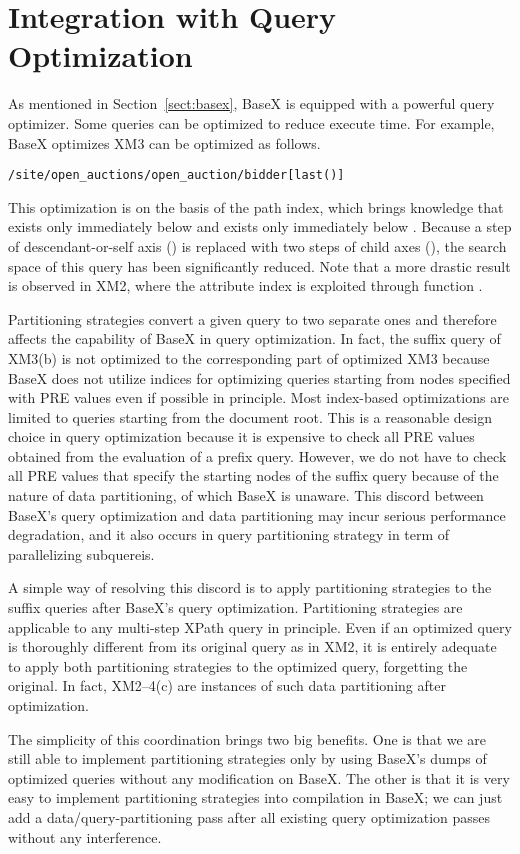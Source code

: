 \section{Integration with Query Optimization}
\label{sect:opt}

As mentioned in Section~\ref{sect:basex}, BaseX is equipped with a powerful
query optimizer. Some queries can be optimized to reduce execute time. For
example, BaseX optimizes XM3 can be optimized as follows.

\begin{lstlisting}
/site/open_auctions/open_auction/bidder[last()]
\end{lstlisting}

This optimization is on the basis of the path index, which brings knowledge that
 exists only immediately below  and
 exists only immediately below . Because a step of
descendant-or-self axis () is replaced with two steps of
child axes (), the search space of this query
has been significantly reduced. Note that a more drastic result is observed in
XM2, where the attribute index is exploited through function . 

Partitioning strategies convert a given query to two separate ones and therefore
affects the capability of BaseX in query optimization. In fact, the suffix query
of XM3(b) is not optimized to the corresponding part of optimized XM3 because
BaseX does not utilize indices for optimizing queries starting from nodes
specified with PRE values even if possible in principle. Most index-based
optimizations are limited to queries starting from the document root. This is a
reasonable design choice in query optimization because it is expensive to check
all PRE values obtained from the evaluation of a prefix query. However, we do
not have to check all PRE values that specify the starting nodes of the suffix
query because of the nature of data partitioning, of which BaseX is unaware.
This discord between BaseX's query optimization and data partitioning may incur
serious performance degradation, and it also occurs in query partitioning
strategy in term of parallelizing subquereis.

A simple way of resolving this discord is to apply partitioning strategies to
the suffix queries after BaseX's query optimization. Partitioning strategies are
applicable to any multi-step XPath query in principle. Even if an optimized
query is thoroughly different from its original query as in XM2, it is entirely
adequate to apply both partitioning strategies to the optimized query,
forgetting the original. In fact, XM2--4(c) are instances of such data
partitioning after optimization.

The simplicity of this coordination brings two big benefits. One is that we are
still able to implement partitioning strategies only by using BaseX's dumps of
optimized queries without any modification on BaseX. The other is that it is
very easy to implement partitioning strategies into compilation in BaseX; we can
just add a data/query-partitioning pass after all existing query optimization
passes without any interference.
